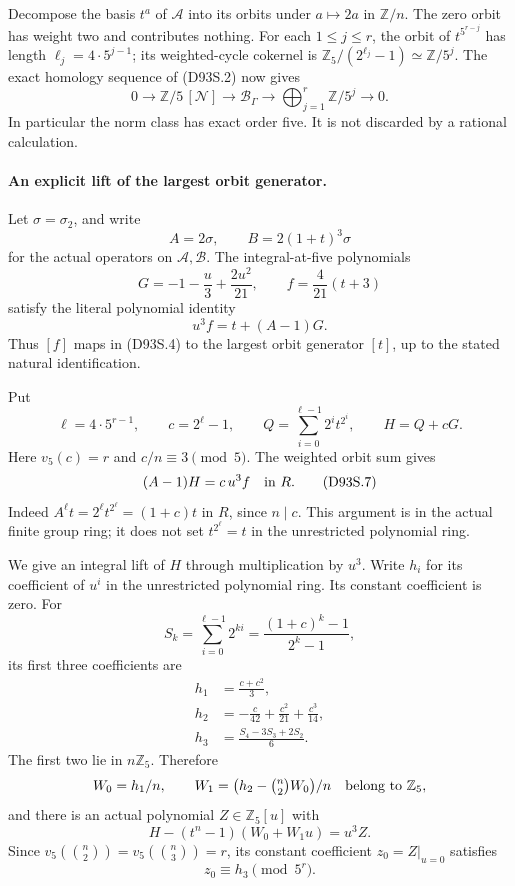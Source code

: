 Decompose the basis \(t^a\) of \(\mathscr A\) into its orbits
under \(a\mapsto2a\) in \(\mathbb Z/n\).
The zero orbit has weight two and contributes nothing.
For each \(1\le j\le r\), the orbit of
\(t^{5^{r-j}}\) has length \(\ell_j=4\cdot5^{j-1}\);
its weighted-cycle cokernel is
\(\mathbb Z_5/(2^{\ell_j}-1)\simeq\mathbb Z/5^j\).
The exact homology sequence of (D93S.2) now gives
\[
 0\longrightarrow\mathbb Z/5\,[\mathcal N]
 \longrightarrow\mathscr B_\Gamma
 \longrightarrow\bigoplus_{j=1}^r\mathbb Z/5^j
 \longrightarrow0.                                  \tag{D93S.4}
\]
In particular the norm class has exact order five. It is
not discarded by a rational calculation.

\paragraph{An explicit lift of the largest orbit generator.}
Let \(\sigma=\sigma_2\), and write
\[
 A=2\sigma,\qquad B=2(1+t)^3\sigma
\]
for the actual operators on \(\mathscr A,\mathscr B\).
The integral-at-five polynomials
\[
 G=-1-\frac{u}{3}+\frac{2u^2}{21},
       \qquad f=\frac4{21}(t+3)
\]
satisfy the literal polynomial identity
\[
                 u^3 f=t+(A-1)G.                     \tag{D93S.5}
\]
Thus \([f]\) maps in (D93S.4) to the largest orbit
generator \([t]\), up to the stated natural identification.

Put
\[
 \ell=4\cdot5^{r-1},\qquad
 c=2^\ell-1,\qquad
 Q=\sum_{i=0}^{\ell-1}2^i t^{2^i},\qquad H=Q+cG .
                                                               \tag{D93S.6}
\]
Here \(v_5(c)=r\) and \(c/n\equiv3\pmod5\).
The weighted orbit sum gives
\[
                       (A-1)H=c\,u^3f
                          \quad\hbox{in }R.           \tag{D93S.7}
\]
Indeed \(A^\ell t=2^\ell t^{2^\ell}=(1+c)t\) in
\(R\), since \(n\mid c\). This argument is in the actual
finite group ring; it does not set \(t^{2^\ell}=t\)
in the unrestricted polynomial ring.

We give an integral lift of \(H\) through multiplication
by \(u^3\). Write \(h_i\) for its coefficient of \(u^i\)
in the unrestricted polynomial ring. Its constant
coefficient is zero. For
\[
        S_k=\sum_{i=0}^{\ell-1}2^{ki}
               =\frac{(1+c)^k-1}{2^k-1},
\]
its first three coefficients are
\[
 \begin{aligned}
 h_1&=\frac{c+c^2}{3},\\
 h_2&=-\frac c{42}+\frac{c^2}{21}+\frac{c^3}{14},\\
 h_3&=\frac{S_4-3S_3+2S_2}{6}.
 \end{aligned}                                       \tag{D93S.8}
\]
The first two lie in \(n\mathbb Z_5\). Therefore
\[
 W_0=h_1/n,\qquad
 W_1=\bigl(h_2-\tbinom n2W_0\bigr)/n
                       \quad\hbox{belong to }\mathbb Z_5,
\]
and there is an actual polynomial \(Z\in\mathbb Z_5[u]\)
with
\[
 H-(t^n-1)(W_0+W_1u)=u^3Z.                            \tag{D93S.9}
\]
Since \(v_5(\binom n2)=v_5(\binom n3)=r\), its
constant coefficient \(z_0=Z|_{u=0}\) satisfies
\[
                         z_0\equiv h_3\pmod{5^r}.      \tag{D93S.10}
\]

